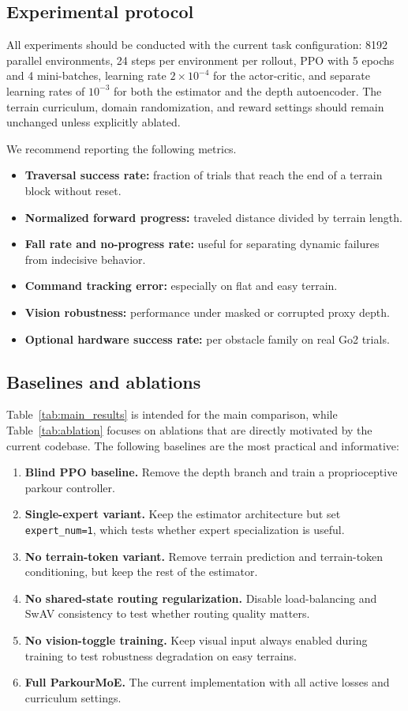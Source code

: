 \documentclass[letterpaper,10pt,conference]{ieeeconf}
\begin{document}
\subsection{Experimental protocol}
All experiments should be conducted with the current task configuration: 8192 parallel environments, 24 steps per environment per rollout, PPO with 5 epochs and 4 mini-batches, learning rate $2\times10^{-4}$ for the actor-critic, and separate learning rates of $10^{-3}$ for both the estimator and the depth autoencoder. The terrain curriculum, domain randomization, and reward settings should remain unchanged unless explicitly ablated.

We recommend reporting the following metrics.
\begin{itemize}
    \item \textbf{Traversal success rate:} fraction of trials that reach the end of a terrain block without reset.
    \item \textbf{Normalized forward progress:} traveled distance divided by terrain length.
    \item \textbf{Fall rate and no-progress rate:} useful for separating dynamic failures from indecisive behavior.
    \item \textbf{Command tracking error:} especially on flat and easy terrain.
    \item \textbf{Vision robustness:} performance under masked or corrupted proxy depth.
    \item \textbf{Optional hardware success rate:} per obstacle family on real Go2 trials.
\end{itemize}

\subsection{Baselines and ablations}
Table~\ref{tab:main_results} is intended for the main comparison, while Table~\ref{tab:ablation} focuses on ablations that are directly motivated by the current codebase. The following baselines are the most practical and informative:
\begin{enumerate}
    \item \textbf{Blind PPO baseline.} Remove the depth branch and train a proprioceptive parkour controller.
    \item \textbf{Single-expert variant.} Keep the estimator architecture but set \texttt{expert\_num=1}, which tests whether expert specialization is useful.
    \item \textbf{No terrain-token variant.} Remove terrain prediction and terrain-token conditioning, but keep the rest of the estimator.
    \item \textbf{No shared-state routing regularization.} Disable load-balancing and SwAV consistency to test whether routing quality matters.
    \item \textbf{No vision-toggle training.} Keep visual input always enabled during training to test robustness degradation on easy terrains.
    \item \textbf{Full ParkourMoE.} The current implementation with all active losses and curriculum settings.
\end{enumerate}
\end{document}
